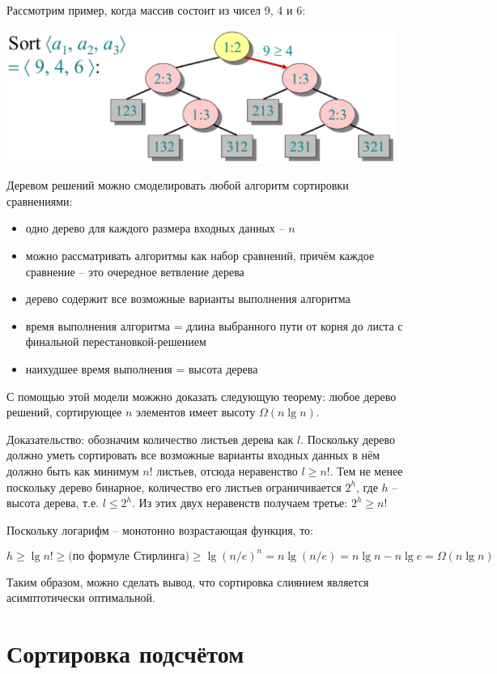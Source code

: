 \documentclass[a4paper,11pt]{article}
\begin{document}
Рассмотрим пример, когда массив состоит из чисел 9, 4 и 6:

\includegraphics[width=5in]{lecture5/tree2.eps}

Деревом решений можно смоделировать любой алгоритм сортировки сравнениями:
\begin{itemize}
\item одно дерево для каждого размера входных данных -- $n$
\item можно рассматривать алгоритмы как набор сравнений, причём каждое сравнение
  -- это очередное ветвление дерева
\item дерево содержит все возможные варианты выполнения алгоритма
\item время выполнения алгоритма = длина выбранного пути от корня до листа с
  финальной перестановкой-решением
\item наихудшее время выполнения = высота дерева
\end{itemize}

С помощью этой модели можжно доказать следующую теорему: любое дерево решений,
сортирующее $n$ элементов имеет высоту $\Omega(n \lg n)$.

Доказательство: обозначим количество листьев дерева как $l$. Поскольку дерево
должно уметь сортировать все возможные варианты входных данных в нём должно быть
как минимум $n!$ листьев, отсюда неравенство $l \geqslant n!$. Тем не менее
поскольку дерево бинарное, количество его листьев ограничивается $2^h$, где $h$
-- высота дерева, т.е. $l \leqslant 2^h$. Из этих двух неравенств получаем
третье: $2^h \geqslant n!$

Поскольку логарифм -- монотонно возрастающая функция, то:

$$h \geqslant \lg n! \geqslant \text{(по формуле Стирлинга)} \geqslant \lg (n/e)^n
= n \lg(n/e) = n\lg n - n \lg e = \Omega(n \lg n)$$

Таким образом, можно сделать вывод, что сортировка слиянием является
асимптотически оптимальной.

\section{Сортировка подсчётом}
\end{document}
